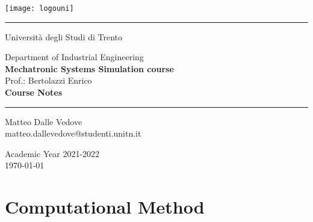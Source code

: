 \documentclass[10 pt,letterpaper,twoside,openright]{book}
\begin{document}
	
	\frontmatter
	
	\begin{center}
		\vspace{3cm}
		\thispagestyle{empty}
		\texttt{[image: logouni]}
		
		\vspace{1cm}
		\rule{5cm}{0.5pt}
		\vspace{1cm}		
		
		{\Large Università degli Studi di Trento}
		
		\vspace{2cm}
		{\Large Department of Industrial Engineering} \\ \vspace{2mm}
		{\LARGE \textbf{Mechatronic Systems Simulation course}} \\ \vspace{2mm}
		{\Large Prof.: Bertolazzi Enrico}\\
		
		\vspace{2cm}
		{\LARGE \textbf{Course Notes}}
		
		\vspace{1cm}
		\rule{5cm}{0.5pt}
		\vspace{1cm}	
		
		{\large 
			Matteo Dalle Vedove \\
			\makeatletter
			matteo.dallevedove@studenti.unitn.it
			
			\vspace{2cm}
			Academic Year 2021-2022 \\ \today}
	\end{center}
	
	\tableofcontents
	\mainmatter
	
	\part{Computational Method}
	
	
		
	
	
	
	
	
	
\end{document}
